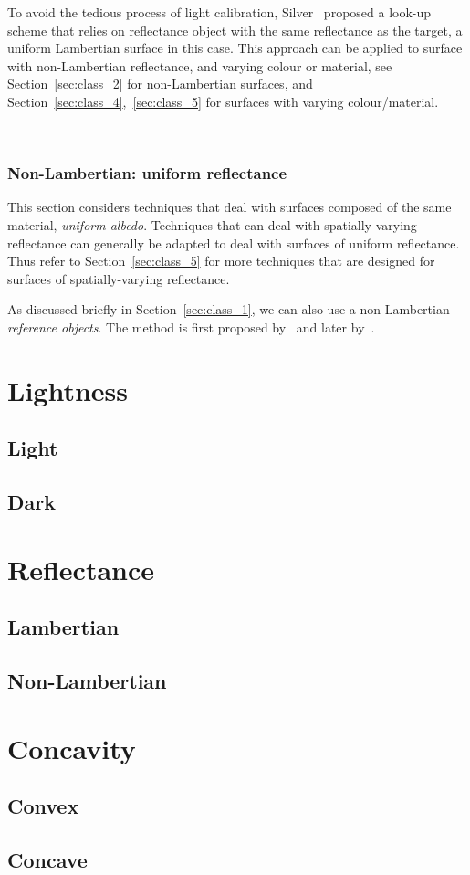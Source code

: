 To avoid the tedious process of light calibration, Silver~\cite{silver1980determining} proposed a look-up scheme that relies on reflectance object with the same reflectance as the target, a uniform Lambertian surface in this case. This approach can be applied to surface with non-Lambertian reflectance, and varying colour or material, see Section~\ref{sec:class_2} for non-Lambertian surfaces, and Section~\ref{sec:class_4},~\ref{sec:class_5} for surfaces with varying colour/material.

\
\subsubsection{Non-Lambertian: uniform reflectance}
This section considers techniques that deal with surfaces composed of the same material, \ie \textit{uniform albedo}. Techniques that can deal with spatially varying reflectance can generally be adapted to deal with surfaces of uniform reflectance. Thus refer to Section~\ref{sec:class_5} for more techniques that are designed for surfaces of spatially-varying reflectance.

As discussed briefly in Section~\ref{sec:class_1}, we can also use a non-Lambertian \textit{reference objects}. The method is first proposed by~\citeauthor{silver1980determining} and later by~\citeauthor{hertzmann2005example}.

\section{Lightness}

\subsection{Light}

\subsection{Dark}

\section{Reflectance}

\subsection{Lambertian}

\subsection{Non-Lambertian}

\section{Concavity}

\subsection{Convex}

\subsection{Concave}